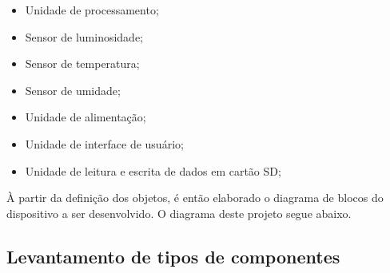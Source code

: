  \begin{itemize}
     \item Unidade de processamento;
     \item Sensor de luminosidade;
     \item Sensor de temperatura; 
     \item Sensor de umidade;
     \item Unidade de alimentação;
     \item Unidade de interface de usuário;
     \item Unidade de leitura e escrita de dados em cartão SD;
 \end{itemize}

À partir da definição dos objetos, é então elaborado o diagrama de blocos do dispositivo a ser desenvolvido. O diagrama deste projeto segue abaixo.

    \begin{figure}[h!]
            \captionsetup{width=16cm}
   \end{figure}

\subsection{Levantamento de tipos de componentes}\label{subsec:levantamento_tipos}


